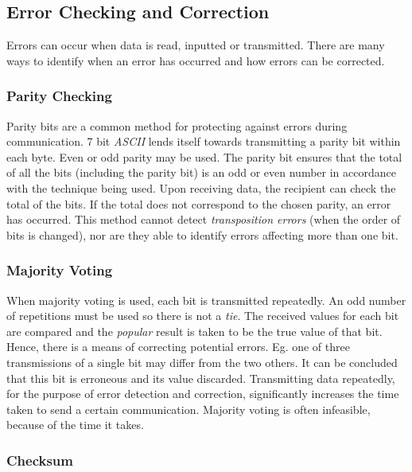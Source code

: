 \documentclass[9pt]{article}
\begin{document}
\subsection{Error Checking and Correction}
\label{sec:org7291392}

Errors can occur when data is read, inputted or transmitted. There are many ways to identify when an error has occurred and how errors can be corrected.

\subsubsection{Parity Checking}
\label{sec:orgcd3fc73}

Parity bits are a common method for protecting against errors during communication. 7 bit \emph{ASCII} lends itself towards transmitting a parity bit within each byte. Even or odd parity may be used. The parity bit ensures that the total of all the bits (including the parity bit) is an odd or even number in accordance with the technique being used. Upon receiving data, the recipient can check the total of the bits. If the total does not correspond to the chosen parity, an error has occurred. This method cannot detect \emph{transposition errors} (when the order of bits is changed), nor are they able to identify errors affecting more than one bit.

\subsubsection{Majority Voting}
\label{sec:org175653b}

When majority voting is used, each bit is transmitted repeatedly. An odd number of repetitions must be used so there is not a \emph{tie}. The received values for each bit are compared and the \emph{popular} result is taken to be the true value of that bit. Hence, there is a means of correcting potential errors. Eg. one of three transmissions of a single bit may differ from the two others. It can be concluded that this bit is erroneous and its value discarded. Transmitting data repeatedly, for the purpose of error detection and correction, significantly increases the time taken to send a certain communication. Majority voting is often infeasible, because of the time it takes.

\subsubsection{Checksum}
\label{sec:org13ecb61}
\end{document}

